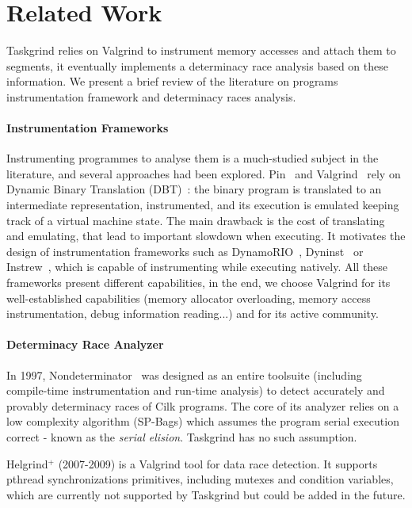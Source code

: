 
\section{Related Work} \label{sec:relworks}
Taskgrind relies on Valgrind to instrument memory accesses and attach them to segments, it eventually implements a determinacy race analysis based on these information.
We present a brief review of the literature on programs instrumentation framework and determinacy races analysis.

\paragraph{Instrumentation Frameworks}
Instrumenting programmes to analyse them is a much-studied subject in the literature, and several approaches had been explored.
Pin~\cite{pin} and Valgrind~\cite{valgrind} rely on Dynamic Binary Translation (DBT)~\cite{dbt}: the binary program is translated to an intermediate representation, instrumented, and its execution is emulated keeping track of a virtual machine state.
The main drawback is the cost of translating and emulating, that lead to important slowdown when executing.
It motivates the design of instrumentation frameworks such as DynamoRIO~\cite{dynamorio}, Dyninst~\cite{dyninstr} or Instrew~\cite{llvm-dbi}, which is capable of instrumenting while executing natively.
All these frameworks present different capabilities, in the end, we choose Valgrind for its well-established capabilities (memory allocator overloading, memory access instrumentation, debug information reading...) and for its active community.

\paragraph{Determinacy Race Analyzer}
In 1997, Nondeterminator~\cite{nondeterminator} was designed as an entire toolsuite (including compile-time instrumentation and run-time analysis) to detect accurately and provably determinacy races of Cilk programs.
The core of its analyzer relies on a low complexity algorithm (SP-Bags) which assumes the program serial execution correct - known as the \emph{serial elision}.
Taskgrind has no such assumption.

Helgrind$^{+}$ (2007-2009) is a Valgrind tool for data race detection.
It supports pthread synchronizations primitives, including mutexes and condition variables, which are currently not supported by Taskgrind but could be added in the future.

